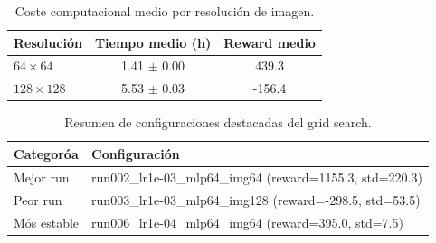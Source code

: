 \begin{table}[H]
\centering
\caption{Coste computacional medio por resolución de imagen.}
\label{tab:cost_by_resolution}
\begin{tabular}{lcc}
\toprule
Resolución & Tiempo medio (h) & Reward medio \\
\midrule
$64\times64$ & 1.41 $\pm$ 0.00 & 439.3 \\
$128\times128$ & 5.53 $\pm$ 0.03 & -156.4 \\
\bottomrule
\end{tabular}
\end{table}

\begin{table}[H]
\centering
\caption{Resumen de configuraciones destacadas del grid search.}
\label{tab:grid_best_worst_stable}
\begin{tabular}{p{2.0cm}p{4.0cm}}
\toprule
Categoróa & Configuración \\
\midrule
Mejor run & run002\_lr1e-03\_mlp64\_img64 (reward=1155.3, std=220.3) \\
Peor run & run003\_lr1e-03\_mlp64\_img128 (reward=-298.5, std=53.5) \\
Mós estable & run006\_lr1e-04\_mlp64\_img64 (reward=395.0, std=7.5) \\
\bottomrule
\end{tabular}
\end{table}